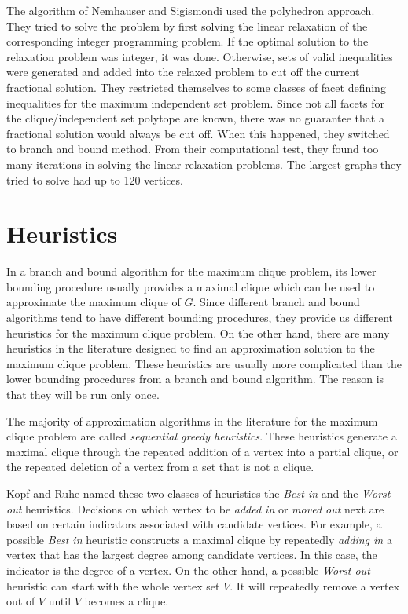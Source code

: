 The algorithm of Nemhauser and Sigismondi \cite{NeSi92} used the
polyhedron approach. They tried to solve the problem by first
solving the linear relaxation of the corresponding integer
programming problem. If the optimal solution to the relaxation
problem was integer, it was done. Otherwise, sets of valid
inequalities were generated and added into the relaxed problem to
cut off the current fractional solution. They restricted themselves
to some classes of facet defining inequalities for the maximum
independent set problem. Since not all facets for the
clique/independent set polytope are known, there was no guarantee
that a fractional solution would always be cut off. When this
happened, they switched to branch and bound method. From their
computational test, they found too many iterations in solving the
linear relaxation problems. The largest graphs they tried to solve
had up to 120 vertices. 



\section{Heuristics}

In a branch and bound algorithm for the maximum clique problem, its
lower bounding procedure usually provides a maximal clique which can
be used to approximate the maximum clique of $G$. Since different
branch and bound algorithms tend to have different bounding
procedures, they provide us different heuristics for the maximum
clique problem. On the other hand, there are many heuristics in the
literature designed to find an approximation solution to the maximum
clique problem. These heuristics are usually more complicated than
the lower bounding procedures from a branch and bound algorithm. The
reason is that they will be run only once. 


The majority of approximation algorithms in the literature for the
maximum clique problem are called {\em sequential greedy heuristics}.
These heuristics generate a maximal clique through the
repeated addition of a vertex into a partial clique, or the repeated
deletion of a vertex from a set that is not a clique.

Kopf and Ruhe \cite{KoRu87} named these two classes of heuristics
the {\em Best in} and the {\em Worst out} heuristics. Decisions on
which vertex to be {\em added in} or {\em moved out} next are based
on certain indicators associated with candidate vertices. For
example, a possible {\em Best in} heuristic constructs a maximal
clique by repeatedly {\em adding in} a vertex that has the largest
degree among candidate vertices. In this case, the indicator is the
degree of a vertex. On the other hand, a possible {\em Worst out}
heuristic can start with the whole vertex set $V$. It will
repeatedly remove a vertex out of $V$ until $V$ becomes a clique.


